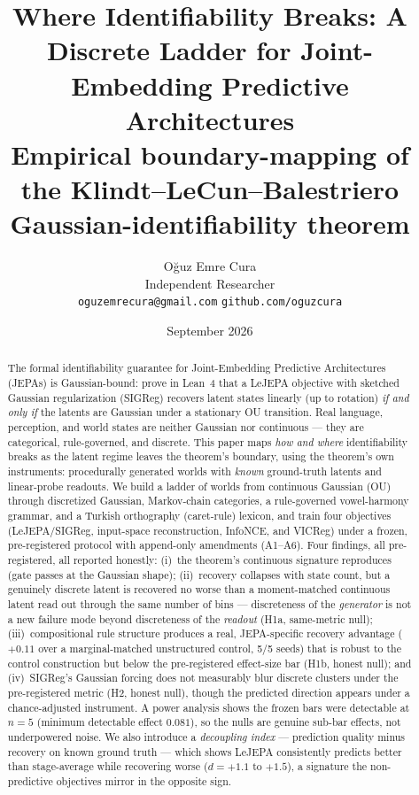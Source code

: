 \documentclass[11pt]{article}
\title{Where Identifiability Breaks: A Discrete Ladder for
Joint-Embedding Predictive Architectures\\[2pt]
{\large Empirical boundary-mapping of the Klindt--LeCun--Balestriero
Gaussian-identifiability theorem}}
\author{O\u{g}uz Emre Cura\\
Independent Researcher\\
\small \texttt{oguzemrecura@gmail.com} \quad \texttt{github.com/oguzcura}}
\date{September 2026}
\begin{document}
\maketitle

\begin{abstract}
\noindent
The formal identifiability guarantee for Joint-Embedding Predictive
Architectures (JEPAs) is Gaussian-bound: \citet{klindt2026lejepa} prove in
Lean~4 that a LeJEPA objective with sketched Gaussian regularization (SIGReg)
recovers latent states linearly (up to rotation) \emph{if and only if} the
latents are Gaussian under a stationary OU transition. Real language,
perception, and world states are neither Gaussian nor continuous --- they are
categorical, rule-governed, and discrete. This paper maps \emph{how and where}
identifiability breaks as the latent regime leaves the theorem's boundary,
using the theorem's own instruments: procedurally generated worlds with
\emph{known} ground-truth latents and linear-probe readouts. We build a ladder
of worlds from continuous Gaussian (OU) through discretized Gaussian,
Markov-chain categories, a rule-governed vowel-harmony grammar, and a Turkish
orthography (caret-rule) lexicon, and train four objectives (LeJEPA/SIGReg,
input-space reconstruction, InfoNCE, and VICReg) under a frozen,
pre-registered protocol with append-only amendments (A1--A6). Four findings,
all pre-registered, all reported honestly: (i)~the theorem's continuous
signature reproduces (gate passes at the Gaussian shape); (ii)~recovery
collapses with state count, but a genuinely discrete latent is recovered no
worse than a moment-matched continuous latent read out through the same number
of bins --- discreteness of the \emph{generator} is not a new failure mode
beyond discreteness of the \emph{readout} (H1a, same-metric null);
(iii)~compositional rule structure produces a real, JEPA-specific recovery
advantage ($+0.11$ over a marginal-matched unstructured control, 5/5 seeds)
that is robust to the control construction but below the pre-registered
effect-size bar (H1b, honest null); and (iv)~SIGReg's Gaussian forcing does not
measurably blur discrete clusters under the pre-registered metric (H2, honest
null), though the predicted direction appears under a chance-adjusted
instrument. A power analysis shows the frozen bars were detectable at $n{=}5$
(minimum detectable effect $0.081$), so the nulls are genuine sub-bar effects,
not underpowered noise. We also introduce a \emph{decoupling index} ---
prediction quality minus recovery on known ground truth --- which shows LeJEPA
consistently predicts better than stage-average while recovering worse
($d{=}{+}1.1$ to $+1.5$), a signature the non-predictive objectives mirror in
the opposite sign.
\end{abstract}
\end{document}
